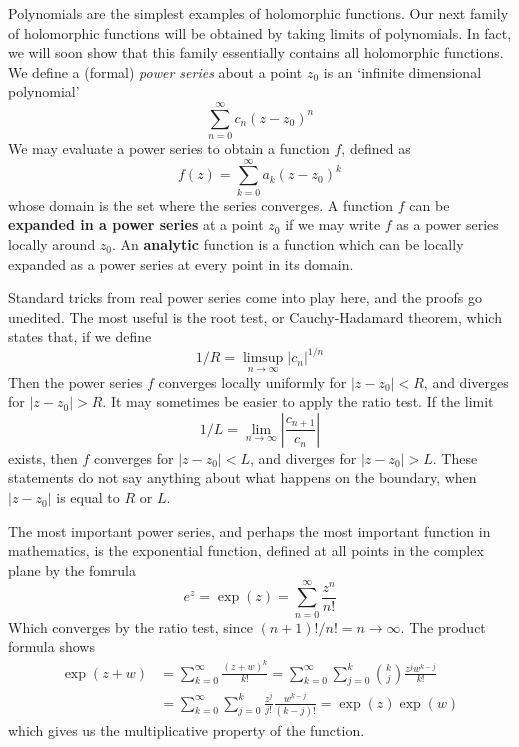 Polynomials are the simplest examples of holomorphic functions. Our next family of holomorphic functions will be obtained by taking limits of polynomials. In fact, we will soon show that this family essentially contains all holomorphic functions. We define a (formal) {\it power series} about a point $z_0$ is an `infinite dimensional polynomial'
%
\[ \sum_{n = 0}^\infty c_n (z - z_0)^n \]
%
We may evaluate a power series to obtain a function $f$, defined as
%
\[ f(z) = \sum_{k = 0}^\infty a_k (z - z_0)^k \]
%
whose domain is the set where the series converges. A function $f$ can be {\bf expanded in a power series} at a point $z_0$ if we may write $f$ as a power series locally around $z_0$. An {\bf analytic} function is a function which can be locally expanded as a power series at every point in its domain.

Standard tricks from real power series come into play here, and the proofs go unedited. The most useful is the root test, or Cauchy-Hadamard theorem, which states that, if we define
%
\[ 1/R = \limsup_{n \to \infty} |c_n|^{1/n} \]
%
Then the power series $f$ converges locally uniformly for $|z - z_0| < R$, and diverges for $|z - z_0| > R$. It may sometimes be easier to apply the ratio test. If the limit
%
\[ 1/L = \lim_{n \to \infty} \left| \frac{c_{n+1}}{c_n} \right| \]
%
exists, then $f$ converges for $|z - z_0| < L$, and diverges for $|z - z_0| > L$. These statements do not say anything about what happens on the boundary, when $|z - z_0|$ is equal to $R$ or $L$.

\begin{example}
    The most important power series, and perhaps the most important function in mathematics, is the exponential function, defined at all points in the complex plane by the fomrula
    \[ e^z = \exp(z) = \sum_{n = 0}^\infty \frac{z^n}{n!} \]
    Which converges by the ratio test, since $(n+1)!/n! = n \to \infty$. The product formula shows
    \begin{align*}
    \exp(z + w) &= \sum_{k = 0}^\infty \frac{(z + w)^k}{k!} = \sum_{k = 0}^\infty \sum_{j = 0}^k \binom{k}{j} \frac{z^j w^{k-j}}{k!}\\
    &= \sum_{k = 0}^\infty \sum_{j = 0}^k \frac{z^j}{j!} \frac{w^{k-j}}{(k - j)!} = \exp(z) \exp(w)
    \end{align*}
    which gives us the multiplicative property of the function.
\end{example}

